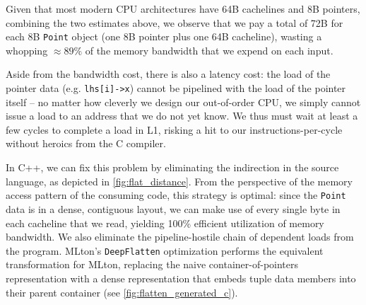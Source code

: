 Given that most modern CPU architectures have 64B cachelines and 8B pointers,
combining the two estimates above, we observe that we pay a total of 72B for
each 8B \texttt{Point} object (one 8B pointer plus one 64B cacheline), wasting a
whopping $\approx 89\%$ of the memory bandwidth that we expend on each input.

Aside from the bandwidth cost, there is also a latency cost: the load of the
pointer data (e.g. \texttt{lhs[i]->x}) cannot be pipelined with the load of the
pointer itself -- no matter how cleverly we design our out-of-order CPU, we
simply cannot issue a load to an address that we do not yet know. We thus must
wait at least a few cycles to complete a load in L1, risking a hit to our
instructions-per-cycle without heroics from the C compiler.


In C++, we can fix this problem by eliminating the indirection in the source
language, as depicted in \cref{fig:flat_distance}. From the perspective of the
memory access pattern of the consuming code, this strategy is optimal: since the
\texttt{Point} data is in a dense, contiguous layout, we can make use of every
single byte in each cacheline that we read, yielding 100\% efficient utilization
of memory bandwidth. We also eliminate the pipeline-hostile chain of dependent
loads from the program. MLton's \texttt{DeepFlatten} optimization performs the
equivalent transformation for MLton, replacing the naive container-of-pointers
representation with a dense representation that embeds tuple data members into
their parent container (see \cref{fig:flatten_generated_c}).

